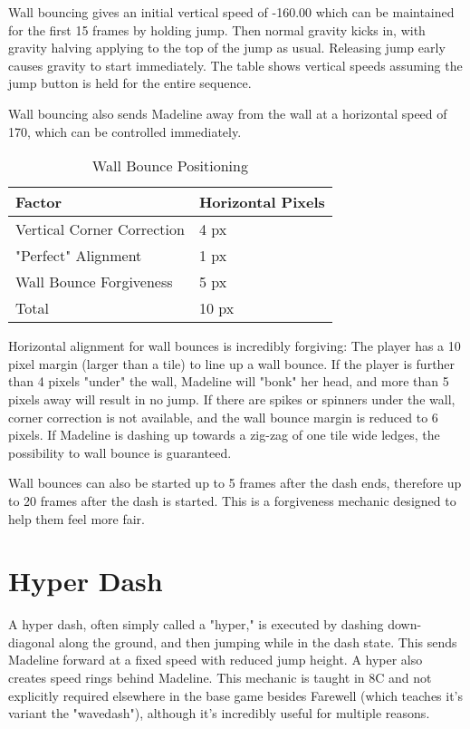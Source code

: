 \documentclass[oneside]{book}
\begin{document}
Wall bouncing gives an initial vertical speed of -160.00 which can be maintained for the first 15 frames by holding jump. Then normal gravity kicks in, with gravity halving applying to the top of the jump as usual. Releasing jump early causes gravity to start immediately. The table shows vertical speeds assuming the jump button is held for the entire sequence.

Wall bouncing also sends Madeline away from the wall at a horizontal speed of 170, which can be controlled immediately.

\begin{table}[h]
\begin{tabular}{|l|l|}
\hline
Factor&Horizontal Pixels\\
\hline
Vertical Corner Correction&4 px\\
\hline
"Perfect" Alignment&1 px\\
\hline
Wall Bounce Forgiveness&5 px\\
\hline
Total& 10 px\\
\hline
\end{tabular}
\caption{Wall Bounce Positioning}
\end{table}

Horizontal alignment for wall bounces is incredibly forgiving: The player has a 10 pixel margin (larger than a tile) to line up a wall bounce. If the player is further than 4 pixels "under" the wall, Madeline will "bonk" her head, and more than 5 pixels away will result in no jump. If there are spikes or spinners under the wall, corner correction is not available, and the wall bounce margin is reduced to 6 pixels. If Madeline is dashing up towards a zig-zag of one tile wide ledges, the possibility to wall bounce is guaranteed.

Wall bounces can also be started up to 5 frames after the dash ends, therefore up to 20 frames after the dash is started. This is a forgiveness mechanic designed to help them feel more fair.

\section{Hyper Dash}

A hyper dash, often simply called a "hyper," is executed by dashing down-diagonal along the ground, and then jumping while in the dash state. This sends Madeline forward at a fixed speed with reduced jump height. A hyper also creates speed rings behind Madeline. This mechanic is taught in 8C and not explicitly required elsewhere in the base game besides Farewell (which teaches it's variant the "wavedash"), although it's incredibly useful for multiple reasons.
\end{document}
